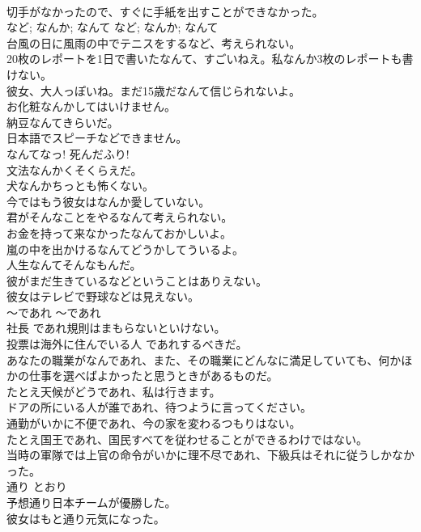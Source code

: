 \documentclass[8pt]{extreport}
\begin{document}
\begin{CJK}{UTF8}{min}
\\	切手がなかったので、すぐに手紙を出すことができなかった。   
\\	など; なんか; なんて	など; なんか; なんて	
\\	台風の日に風雨の中でテニスをするなど、考えられない。   
\\	20枚のレポートを1日で書いたなんて、すごいねえ。私なんか3枚のレポートも書けない。   
\\	彼女、大人っぽいね。まだ15歳だなんて信じられないよ。  
\\	お化粧なんかしてはいけません。   
\\	納豆なんてきらいだ。   
\\	日本語でスピーチなどできません。   
\\	なんてなっ! 死んだふり!  
\\	文法なんかくそくらえだ。   
\\	犬なんかちっとも怖くない。   
\\	今ではもう彼女はなんか愛していない。   
\\	君がそんなことをやるなんて考えられない。   
\\	お金を持って来なかったなんておかしいよ。   
\\	嵐の中を出かけるなんてどうかしてういるよ。   
\\	人生なんてそんなもんだ。   
\\	彼がまだ生きているなどということはありえない。   
\\	彼女はテレビで野球などは見えない。   
\\	〜であれ	〜であれ	
\\	社長 であれ規則はまもらないといけない。  
\\	投票は海外に住んでいる人 であれするべきだ。  
\\	あなたの職業がなんであれ、また、その職業にどんなに満足していても、何かほかの仕事を選べばよかったと思うときがあるものだ。   
\\	たとえ天候がどうであれ、私は行きます。  
\\	ドアの所にいる人が誰であれ、待つように言ってください。  
\\	通勤がいかに不便であれ、今の家を変わるつもりはない。  
\\	たとえ国王であれ、国民すべてを従わせることができるわけではない。  
\\	当時の軍隊では上官の命令がいかに理不尽であれ、下級兵はそれに従うしかなかった。  
\\	通り	とおり	
\\	予想通り日本チームが優勝した。  
\\	彼女はもと通り元気になった。  

\end{CJK}
\end{document}
